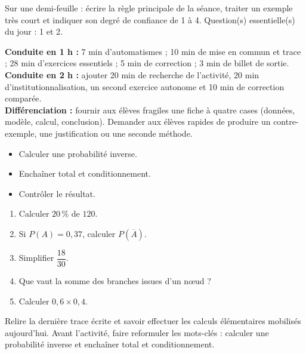 \begin{sortie}Sur une demi-feuille : écrire la règle principale de la séance, traiter un exemple très court et indiquer son degré de confiance de 1 à 4. Question(s) essentielle(s) du jour : 1 et 2.\end{sortie}

\ifprof
\begin{methode}
\textbf{Conduite en 1 h :} 7 min d'automatismes ; 10 min de mise en commun et trace ; 28 min d'exercices essentiels ; 5 min de correction ; 3 min de billet de sortie.\\
\textbf{Conduite en 2 h :} ajouter 20 min de recherche de l'activité, 20 min d'institutionnalisation, un second exercice autonome et 10 min de correction comparée.\\
\textbf{Différenciation :} fournir aux élèves fragiles une fiche à quatre cases (données, modèle, calcul, conclusion). Demander aux élèves rapides de produire un contre-exemple, une justification ou une seconde méthode.
\end{methode}
\fi
{}
    \begin{objectifs}\begin{itemize}\item Calculer une probabilité inverse.\item Enchaîner total et conditionnement.\item Contrôler le résultat.\end{itemize}\end{objectifs}
    \begin{automatismes}\begin{enumerate}\item Calculer $20\,\%$ de $120$. \item Si $P(A)=0{,}37$, calculer $P(\overline A)$. \item Simplifier $\dfrac{18}{30}$. \item Que vaut la somme des branches issues d'un nœud ? \item Calculer $0{,}6\times0{,}4$. \end{enumerate}\end{automatismes}
    \begin{prerequis}Relire la dernière trace écrite et savoir effectuer les calculs élémentaires mobilisés aujourd'hui. Avant l'activité, faire reformuler les mots-clés : calculer une probabilité inverse et enchaîner total et conditionnement.\end{prerequis}

